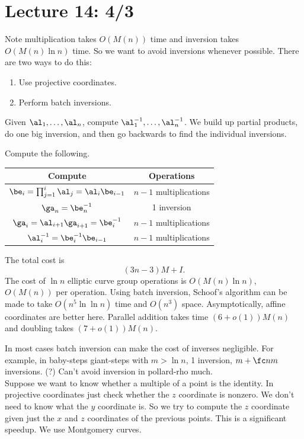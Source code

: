 \section{Lecture 14: 4/3}
Note multiplication takes $O(M(n))$ time and inversion takes $O(M(n)\ln n)$ time. So we want to avoid inversions whenever possible. There are two ways to do this:
\begin{enumerate}
\item
Use projective coordinates.
\item
Perform batch inversions.
\end{enumerate}
\begin{alg}
Given $\al_1,\ldots, \al_n$, compute $\al_1^{-1},\ldots, \al_n^{-1}$. We build up partial products, do one big inversion, and then go backwards to find the individual inversions.

Compute the following.\\

\begin{tabular}{|c|c|}\hline
Compute & Operations\\
\hline
$\be_i=\prod_{j=1}^i \al_j =\al_i\be_{i-1}$
&
$n-1$ multiplications\\
\hline
$\ga_n=\be_n^{-1}$ & 1 inversion\\
\hline
$\ga_i=\al_{i+1}\ga_{i+1}=\be_i^{-1}$ & $n-1$ multiplications\\
\hline
$\al_i^{-1}=\be_i^{-1}\be_{i-1}$ & $n-1$ multiplications\\
\hline
\end{tabular}
\end{alg}
The total cost is
\[
(3n-3)M+I.
\]
The cost of $\ln n$ elliptic curve group operations is $O(M(n)\ln n)$, $O(M(n))$ per operation. Using batch inversion, Schoof's algorithm can be made to take $O(n^5\ln\ln n)$ time  and $O(n^3)$ space. %
Asymptotically, affine coordinates are better here. Parallel addition takes time $(6+o(1))M(n)$ and doubling takes $(7+o(1))M(n)$.

In most cases batch inversion can make the cost of inverses negligible. For example, in baby-steps giant-steps with $m>\ln n$, 1 inversion, $m+\fc nm$ inversions. (?) 
Can't avoid inversion in pollard-rho much.\\

Suppose we want to know whether a multiple of a point is the identity. In projective coordinates just check whether the $z$ coordinate is nonzero. We don't need to know what the $y$ coordinate is. So we try to compute the $z$ coordinate given just the $x$ and $z$ coordinates of the previous points. This is a significant speedup. We use Montgomery curves.

